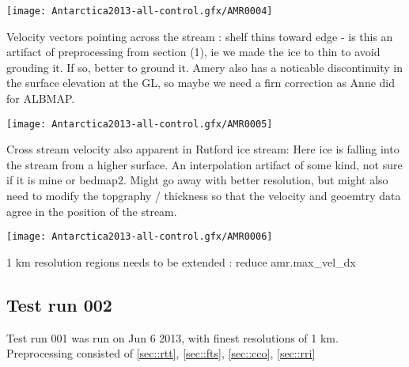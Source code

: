 \documentclass{article}
\begin{document}
\begin{center}
\texttt{[image: Antarctica2013-all-control.gfx/AMR0004]}
\end{center}

Velocity vectors pointing across the stream : shelf thins toward edge - is this an artifact
of preprocessing from section (1), ie we made the ice to thin to avoid grouding it. If
so, better to ground it. Amery also has a noticable discontinuity in the surface elevation at the
GL, so maybe we need a firn correction as Anne did for ALBMAP.

\begin{center}
\texttt{[image: Antarctica2013-all-control.gfx/AMR0005]}
\end{center}

Cross stream velocity also apparent in Rutford ice stream: Here ice is falling into
the stream from a higher surface.  An interpolation artifact of some kind, not sure if it is mine
or bedmap2. Might go away with better resolution, but might also need to modify the topgraphy / thickness 
so that the velocity and geoemtry data agree in the position of the stream. 


\begin{center}
\texttt{[image: Antarctica2013-all-control.gfx/AMR0006]}
\end{center}

1 km resolution regions needs to be extended : reduce amr.max\_vel\_dx 

\subsection{Test run 002}

Test run 001 was run on Jun 6 2013, with finest resolutions of  1 km.
Preprocessing consisted of \ref{sec::rtt}, \ref{sec::fts}, \ref{sec::cco}, \ref{sec::rri}



\end{document}
